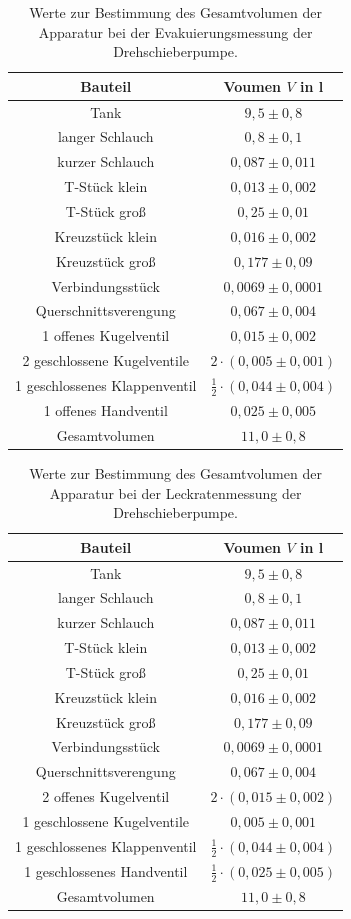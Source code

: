 \begin{table}[H]
\centering
\caption{Werte zur Bestimmung des Gesamtvolumen der Apparatur bei der Evakuierungsmessung der Drehschieberpumpe.}
\label{tab:Volumen_ED}
\begin{tabular}{c|c}
Bauteil & Voumen $V$ in l\\
\hline
Tank &$9,5 \pm 0,8$\\
langer Schlauch &$0,8 \pm 0,1$\\
kurzer Schlauch &$0,087 \pm 0,011$\\
T-Stück klein&$0,013 \pm 0,002$\\
T-Stück groß &$0,25 \pm 0,01$\\
Kreuzstück klein&$0,016 \pm 0,002$\\
Kreuzstück groß&$0,177 \pm 0,09$\\
Verbindungsstück&$0,0069 \pm 0,0001$\\
Querschnittsverengung&$0,067 \pm 0,004$\\
1 offenes Kugelventil&$0,015 \pm 0,002$\\
2 geschlossene Kugelventile&$ 2 \cdot(0,005 \pm 0,001)$\\
1 geschlossenes Klappenventil&$\frac{1}{2}\cdot(0,044 \pm 0,004)$\\
1 offenes Handventil&$0,025 \pm 0,005$\\
\hline
Gesamtvolumen&$11,0 \pm 0,8$\\
\end{tabular}
\end{table}

\begin{table}[H]
\centering
\caption{Werte zur Bestimmung des Gesamtvolumen der Apparatur bei der Leckratenmessung der Drehschieberpumpe.}
\label{tab:Volumen_LD}
\begin{tabular}{c|c}
Bauteil & Voumen $V$ in l\\
\hline
Tank &$9,5 \pm 0,8$\\
langer Schlauch &$0,8 \pm 0,1$\\
kurzer Schlauch &$0,087 \pm 0,011$\\
T-Stück klein&$0,013 \pm 0,002$\\
T-Stück groß &$0,25 \pm 0,01$\\
Kreuzstück klein&$0,016 \pm 0,002$\\
Kreuzstück groß&$0,177 \pm 0,09$\\
Verbindungsstück&$0,0069 \pm 0,0001$\\
Querschnittsverengung&$0,067 \pm 0,004$\\
2 offenes Kugelventil&$2\cdot(0,015 \pm 0,002)$\\
1 geschlossene Kugelventile&$ 0,005 \pm 0,001$\\
1 geschlossenes Klappenventil&$\frac{1}{2}\cdot(0,044 \pm 0,004)$\\
1 geschlossenes Handventil&$\frac{1}{2}\cdot(0,025 \pm 0,005)$\\
\hline
Gesamtvolumen&$11,0 \pm 0,8$\\
\end{tabular}
\end{table}
